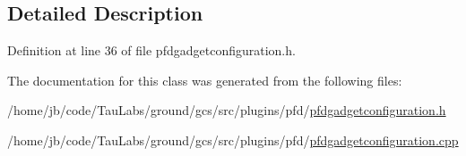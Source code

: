 \subsection{\-Detailed \-Description}


\-Definition at line 36 of file pfdgadgetconfiguration.\-h.



\-The documentation for this class was generated from the following files\-:\begin{DoxyCompactItemize}
\item 
/home/jb/code/\-Tau\-Labs/ground/gcs/src/plugins/pfd/\hyperlink{pfdgadgetconfiguration_8h}{pfdgadgetconfiguration.\-h}\item 
/home/jb/code/\-Tau\-Labs/ground/gcs/src/plugins/pfd/\hyperlink{pfdgadgetconfiguration_8cpp}{pfdgadgetconfiguration.\-cpp}\end{DoxyCompactItemize}
